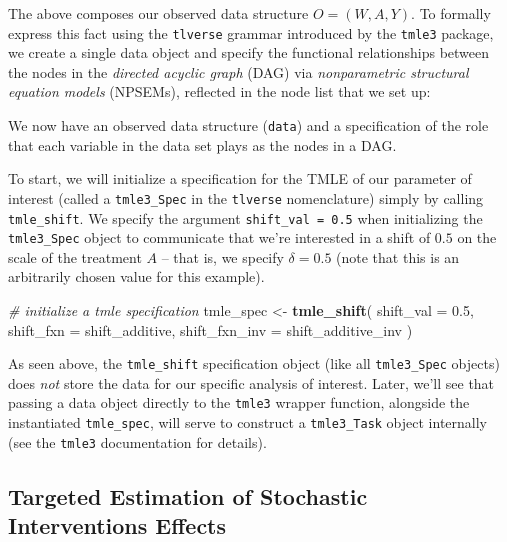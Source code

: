 \documentclass[12pt, krantz2,]{book}
\newenvironment{Shaded}{\begin{snugshade}}{\end{snugshade}}
\newcommand{\CommentTok}[1]{\textcolor[rgb]{0.56,0.35,0.01}{\textit{#1}}}
\newcommand{\DataTypeTok}[1]{\textcolor[rgb]{0.13,0.29,0.53}{#1}}
\newcommand{\FloatTok}[1]{\textcolor[rgb]{0.00,0.00,0.81}{#1}}
\newcommand{\KeywordTok}[1]{\textcolor[rgb]{0.13,0.29,0.53}{\textbf{#1}}}
\newcommand{\NormalTok}[1]{#1}
\newcommand{\StringTok}[1]{\textcolor[rgb]{0.31,0.60,0.02}{#1}}
\theoremstyle{definition}
\theoremstyle{definition}
\theoremstyle{definition}
\newcommand{\1}{\mathbbm{1}}
\begin{document}
The above composes our observed data structure \(O = (W, A, Y)\). To formally
express this fact using the \texttt{tlverse} grammar introduced by the \texttt{tmle3} package,
we create a single data object and specify the functional relationships between
the nodes in the \emph{directed acyclic graph} (DAG) via \emph{nonparametric structural
equation models} (NPSEMs), reflected in the node list that we set up:

We now have an observed data structure (\texttt{data}) and a specification of the role
that each variable in the data set plays as the nodes in a DAG.

To start, we will initialize a specification for the TMLE of our parameter of
interest (called a \texttt{tmle3\_Spec} in the \texttt{tlverse} nomenclature) simply by calling
\texttt{tmle\_shift}. We specify the argument \texttt{shift\_val\ =\ 0.5} when initializing the
\texttt{tmle3\_Spec} object to communicate that we're interested in a shift of \(0.5\) on
the scale of the treatment \(A\) -- that is, we specify \(\delta = 0.5\) (note that
this is an arbitrarily chosen value for this example).

\begin{Shaded}
\begin{Highlighting}[]
\CommentTok{# initialize a tmle specification}
\NormalTok{tmle_spec <-}\StringTok{ }\KeywordTok{tmle_shift}\NormalTok{(}
  \DataTypeTok{shift_val =} \FloatTok{0.5}\NormalTok{,}
  \DataTypeTok{shift_fxn =}\NormalTok{ shift_additive,}
  \DataTypeTok{shift_fxn_inv =}\NormalTok{ shift_additive_inv}
\NormalTok{)}
\end{Highlighting}
\end{Shaded}

As seen above, the \texttt{tmle\_shift} specification object (like all \texttt{tmle3\_Spec}
objects) does \emph{not} store the data for our specific analysis of interest. Later,
we'll see that passing a data object directly to the \texttt{tmle3} wrapper function,
alongside the instantiated \texttt{tmle\_spec}, will serve to construct a \texttt{tmle3\_Task}
object internally (see the \texttt{tmle3} documentation for details).

\hypertarget{targeted-estimation-of-stochastic-interventions-effects}{%
\subsection{Targeted Estimation of Stochastic Interventions Effects}\label{targeted-estimation-of-stochastic-interventions-effects}}
\end{document}
